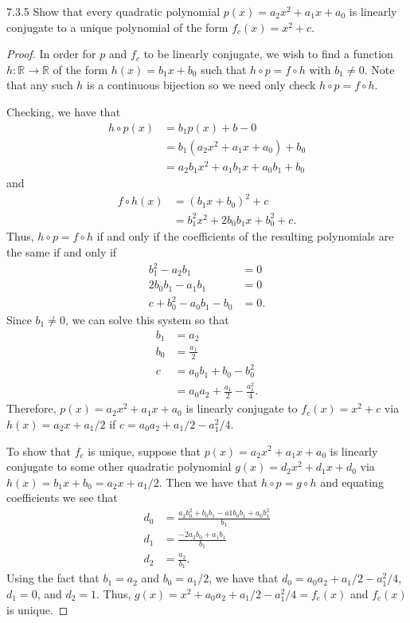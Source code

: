\begin{problem}{7.3.5}
  Show that every quadratic polynomial $p(x) = a_2 x^2 + a_1 x + a_0$ is linearly conjugate
  to a unique polynomial of the form $f_c(x) = x^2 + c$.
\end{problem}

\begin{proof}
  In order for $p$ and $f_c$ to be linearly conjugate, we wish to find a function
  $h: \mathbb{R} \to \mathbb{R}$ of the form $h(x) = b_1 x + b_0$ such that $h \circ p = f \circ h$ with $b_1 \neq 0$.
  Note that any such $h$ is a continuous bijection so we need only check $h \circ p = f \circ h$.

  Checking, we have that
  \begin{align*}
    h \circ p (x) &= b_1 p(x) + b-0 \\
    &= b_1(a_2 x^2 + a_1 x + a_0) + b_0 \\
    &= a_2b_1 x^2 + a_1b_1 x + a_0b_1 + b_0
  \end{align*}
  and
  \begin{align*}
    f \circ h(x) &= \left(b_1 x + b_0\right)^2 + c \\
    &= b_1^2 x^2 + 2b_0 b_1 x + b_0^2 + c.
  \end{align*}
  Thus, $h\circ p = f \circ h$ if and only if the coefficients of the resulting
  polynomials are the same if and only if
  \begin{align*}
    b_1^2 - a_2b_1 &= 0 \\
    2b_0 b_1 - a_1b_1 &= 0 \\
    c + b_0^2 - a_0b_1 - b_0 &= 0.
  \end{align*}
  Since $b_1 \neq 0$, we can solve this system so that
  \begin{align*}
    b_1 &= a_2 \\
    b_0 &= \frac{a_1}{2} \\
    c &= a_0b_1 + b_0 - b_0^2 \\
    &= a_0a_2 + \frac{a_1}{2} - \frac{a_1^2}{4}.
  \end{align*}
  Therefore, $p(x) = a_2 x^2 + a_1 x + a_0$ is linearly conjugate to
  $f_c(x) = x^2 + c$
  via $h(x) = a_2 x + a_1 /2$ if $c = a_0a_2 + a_1/2 - a_1^2/4$.

  To show that $f_c$ is unique, suppose that $p(x) = a_2 x^2 + a_1 x + a_0$
  is linearly conjugate to some other quadratic polynomial $g(x) = d_2 x^2 + d_1 x + d_0$
  via $h(x) = b_1 x + b_0 =a_2 x + a_1 /2$. Then we have that $h \circ p = g \circ h$
  and equating coefficients we see that
  \begin{align*}
    d_0 &= \frac{a_2 b_0^2 + b_0 b_1 - a1 b_0 b_1 + a_0 b_1^2}{b_1}\\
    d_1 &= \frac{-2 a_2 b_0 + a_1 b_1}{b_1} \\
    d_2 &= \frac{a_2}{b_1}.
  \end{align*}
  Using the fact that $b_1 = a_2$ and $b_0 = a_1/2$, we have that $d_0 = a_0a_2 + a_1/2 - a_1^2/4$,
  $d_1 = 0$, and $d_2 = 1$. Thus, $g(x) = x^2 + a_0a_2 + a_1/2 - a_1^2/4= f_c(x)$ and
  $f_c(x)$ is unique.


\end{proof}
